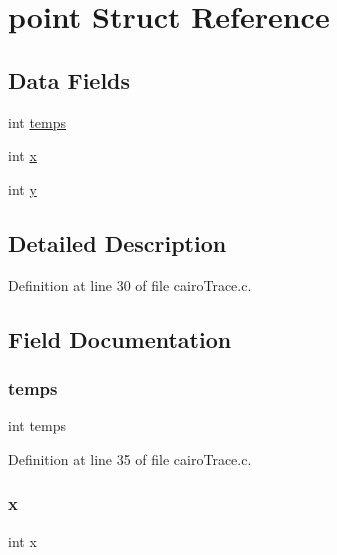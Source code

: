 \hypertarget{structpoint}{}\section{point Struct Reference}
\label{structpoint}
\subsection*{Data Fields}
\begin{DoxyCompactItemize}
\item 
int \hyperlink{structpoint_ac85a28512daa89028cd4dd0024a04ab1}{temps}
\item 
int \hyperlink{structpoint_a6150e0515f7202e2fb518f7206ed97dc}{x}
\item 
int \hyperlink{structpoint_a0a2f84ed7838f07779ae24c5a9086d33}{y}
\end{DoxyCompactItemize}


\subsection{Detailed Description}


Definition at line 30 of file cairo\+Trace.\+c.



\subsection{Field Documentation}
\hypertarget{structpoint_ac85a28512daa89028cd4dd0024a04ab1}{}\label{structpoint_ac85a28512daa89028cd4dd0024a04ab1} 
\subsubsection{\texorpdfstring{temps}{temps}}
{\footnotesize\ttfamily int temps}



Definition at line 35 of file cairo\+Trace.\+c.

\hypertarget{structpoint_a6150e0515f7202e2fb518f7206ed97dc}{}\label{structpoint_a6150e0515f7202e2fb518f7206ed97dc} 
\subsubsection{\texorpdfstring{x}{x}}
{\footnotesize\ttfamily int x}



